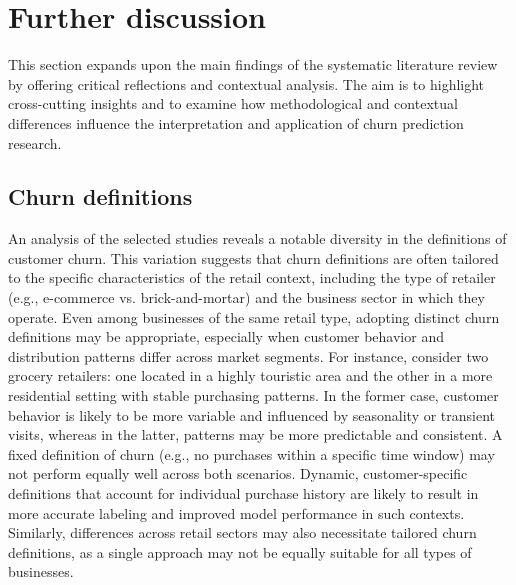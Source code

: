 \section{Further discussion}
\label{sec:discussion}

This section expands upon the main findings of the systematic literature review by offering critical reflections and contextual analysis. The aim is to highlight cross-cutting insights and to examine how methodological and contextual differences influence the interpretation and application of churn prediction research.

\subsection{Churn definitions}
\noindent An analysis of the selected studies reveals a notable diversity in the definitions of customer churn. This variation suggests that churn definitions are often tailored to the specific characteristics of the retail context, including the type of retailer (e.g., e-commerce vs. brick-and-mortar) and the business sector in which they operate. 
Even among businesses of the same retail type, adopting distinct churn definitions may be appropriate, especially when customer behavior and distribution patterns differ across market segments.
For instance, consider two grocery retailers: one located in a highly touristic area and the other in a more residential setting with stable purchasing patterns. In the former case, customer behavior is likely to be more variable and influenced by seasonality or transient visits, whereas in the latter, patterns may be more predictable and consistent. A fixed definition of churn (e.g., no purchases within a specific time window) may not perform equally well across both scenarios. 
Dynamic, customer-specific definitions that account for individual purchase history are likely to result in more accurate labeling and improved model performance in such contexts.
Similarly, differences across retail sectors may also necessitate tailored churn definitions, as a single approach may not be equally suitable for all types of businesses.

